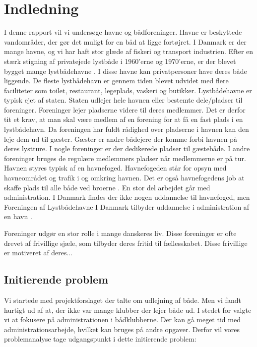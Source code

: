 \chapter{Indledning}
I denne rapport vil vi undersøge havne og bådforeninger. Havne er beskyttede vandområder, der gør det muligt for en båd at ligge fortøjret. I Danmark er der mange havne, og vi har haft stor glæde af fiskeri og transport industrien. Efter en stærk stigning af privatejede lystbåde i 1960'erne og 1970'erne, er der blevet bygget mange lystbådehavne \cite{gyldendal_redaktionen_havn_2013}. I disse havne kan privatpersoner have deres både liggende. De fleste lystbådehavn er gennem tiden blevet udvidet med flere faciliteter som toilet, restaurant, legeplads, vaskeri og butikker. Lystbådehavne er typisk ejet af staten. Staten udlejer hele havnen eller bestemte dele/pladser til foreninger. Foreninger lejer pladserne videre til deres medlemmer. Det er derfor tit et krav, at man skal være medlem af en forening for at få en fast plads i en lystbådehavn. Da foreningen har fuldt rådighed over pladserne i havnen kan den leje dem ud til gæster. Gæster er andre bådejere der komme forbi havnen på deres lystture. I nogle foreninger er der dedikerede pladser til gæstebåde. I andre foreninger bruges de regulære medlemmers pladser når medlemmerne er på tur.
Havnen styres typisk af en havnefoged. Havnefogeden står for opsyn med havneområdet og trafik i og omkring havnen. Det er også havnefogedens job at skaffe plads til alle både ved broerne \cite{undervisningsministeriet_havnefoged_2014}. En stor del arbejdet går med administration. I Danmark findes der ikke nogen uddannelse til havnefoged, men Foreningen af Lystbådehavne I Danmark tilbyder uddannelse i administration af en havn \cite{lystbadehavne_i_danmark}.

Foreninger udgør en stor rolle i mange danskeres liv. Disse foreninger er ofte drevet af frivillige sjæle, som tilbyder deres fritid til fællesskabet. Disse frivillige er motiveret af deres... 

\section{Initierende problem}
\label{initierende}
Vi startede med projektforslaget der talte om udlejning af både. Men vi fandt hurtigt ud af at, der ikke var mange klubber der lejer både ud. I stedet for valgte vi at fokusere på administrationen i bådklubberne. Der kan gå meget tid med administrationsarbejde, hvilket kan bruges på andre opgaver. Derfor vil vores problemanalyse tage udgangspunkt i dette initierende problem:

